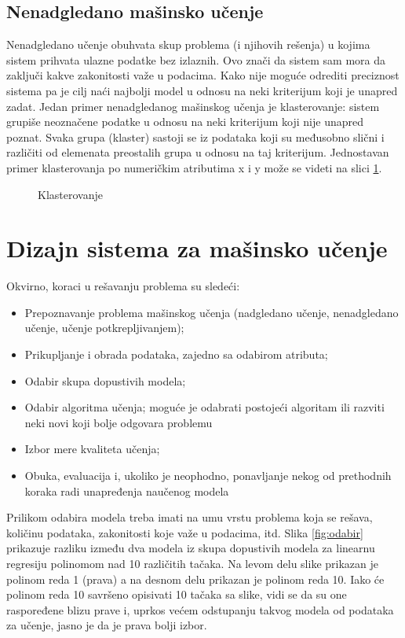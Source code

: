 \subsection{Nenadgledano mašinsko učenje}

Nenadgledano učenje obuhvata skup problema (i njihovih rešenja) u kojima sistem prihvata ulazne podatke bez izlaznih. Ovo znači da sistem sam mora da zaključi kakve zakonitosti važe u podacima.  Kako nije moguće odrediti preciznost sistema pa je cilj naći najbolji model u odnosu na neki kriterijum koji je unapred zadat.
Jedan primer nenadgledanog mašinskog učenja je klasterovanje: sistem grupiše neoznačene podatke u odnosu na  neki kriterijum koji nije unapred poznat. Svaka grupa (klaster) sastoji se iz podataka koji su međusobno slični i različiti od elemenata preostalih grupa u odnosu na taj kriterijum. Jednostavan primer klasterovanja po numeričkim atributima x i y može se videti na slici \ref{fig:klaster}.
	
\begin{figure}
	\centering
	\resizebox{.8\linewidth}{!}{}
	\caption{Klasterovanje}
	\label{fig:klaster}
\end{figure}

\section{Dizajn sistema za mašinsko učenje}

Okvirno, koraci u rešavanju problema su sledeći:
\begin{itemize}
	\item Prepoznavanje problema mašinskog učenja (nadgledano učenje, nenadgledano učenje, učenje potkrepljivanjem);
	\item Prikupljanje i obrada podataka, zajedno sa odabirom atributa;
	\item Odabir skupa dopustivih modela;
	\item Odabir algoritma učenja; moguće je odabrati postojeći algoritam ili razviti neki novi koji bolje odgovara problemu
	\item Izbor mere kvaliteta učenja;
	\item Obuka, evaluacija i, ukoliko je neophodno, ponavljanje nekog od prethodnih koraka radi unapređenja naučenog modela 
\end{itemize}

Prilikom odabira modela treba imati na umu vrstu problema koja se rešava, količinu podataka, zakonitosti koje važe u podacima, itd.
Slika \ref{fig:odabir} prikazuje razliku između dva modela iz skupa dopustivih modela za linearnu regresiju polinomom nad 10 različitih tačaka. Na levom delu slike prikazan je polinom reda 1 (prava) a na desnom delu prikazan je polinom reda 10. Iako će polinom reda 10 savršeno opisivati 10 tačaka sa slike, vidi se da su one raspoređene blizu prave i, uprkos većem odstupanju takvog modela od podataka za učenje, jasno je da je prava bolji izbor.

